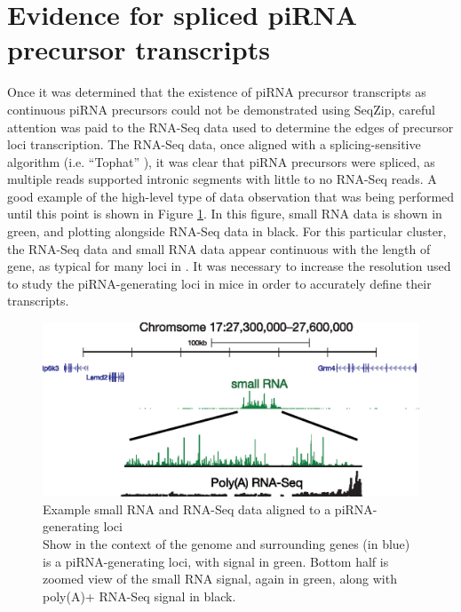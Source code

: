 \section{Evidence for spliced piRNA precursor transcripts}
  \label{SeqZipMethod:sec:piRNA precursors are spliced}

  Once it was determined that the existence of piRNA precursor transcripts as continuous piRNA precursors could not be demonstrated using SeqZip, careful attention was paid to the RNA-Seq data used to determine the edges of precursor loci transcription. The RNA-Seq data, once aligned with a splicing-sensitive algorithm (i.e. ``Tophat'' \citep{Trapnell2009}), it was clear that piRNA precursors were spliced, as multiple reads supported intronic segments with little to no RNA-Seq reads. A good example of the high-level type of data observation that was being performed until this point is shown in Figure \ref{SeqZipMethod:fig:evidence for precusor splicing}. In this figure, small RNA data is shown in green, and plotting alongside RNA-Seq data in black. For this particular cluster, the RNA-Seq data and small RNA data appear continuous with the length of gene, as typical for many loci in \flies{}. It was necessary to increase the resolution used to study the piRNA-generating loci in mice in order to accurately define their transcripts.

  \begin{figure} %
    \centering 
    \includegraphics{Figures/SeqZipMethod/evidenceForPrecursorSplicing.eps}
    \caption[Example small RNA and RNA-Seq data aligned to a piRNA-generating loci]
    {
      Example small RNA and RNA-Seq data aligned to a piRNA-generating loci\\[0.25cm]
      Show in the context of the genome and surrounding genes (in blue) is a piRNA-generating loci, with signal in green. Bottom half is zoomed view of the small RNA signal, again in green, along with poly(A)+ RNA-Seq signal in black.
      }
    \label{SeqZipMethod:fig:evidence for precusor splicing}
    \end{figure}

